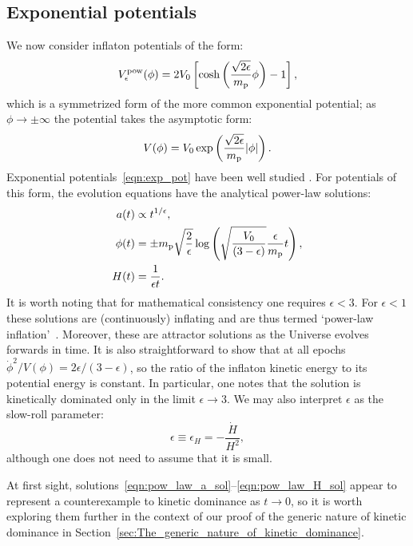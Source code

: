 \subsection{Exponential potentials}
\label{sec:Exponential_potentials}
We now consider inflaton potentials of the form:
%
\begin{equation}
  V^\mathrm{pow}_\epsilon(\phi) 
  = 
  2V_0\left[
  \cosh\left(\frac{\sqrt{2\epsilon}}{m_{\mathrm{p}}}\phi\right)-1
  \right],
  \label{eqn:coshpot}
\end{equation}
%
which is a symmetrized form of the more common exponential potential; as $\phi\rightarrow\pm\infty$ the potential takes the asymptotic form:
%
\begin{equation}
  V(\phi) 
  = 
  V_0 \exp\left(\frac{\sqrt{2\epsilon}}{m_{\mathrm{p}}} |\phi|\right).
  \label{eqn:exp_pot}
\end{equation}
%
Exponential potentials~\eqref{eqn:exp_pot} have been well studied \citep{yokoyama_dynamics_1988}. For potentials of this form, the evolution equations have the analytical power-law solutions:
%
\begin{align}
  a(t) 
  &\propto 
  {t}^{1/\epsilon},
  \label{eqn:pow_law_a_sol}
  \\
  \phi(t)
  &=
  \pm m_{\mathrm{p}}\sqrt{\frac{2}{\epsilon}}
  \log\left(\sqrt{\frac{V_0}{\left(3-\epsilon\right)}}
  \frac{\epsilon}{m_{\mathrm{p}}} t\right),
  \\
  H(t)
  &=
  \frac{1}{\epsilon t}.  
  \label{eqn:pow_law_H_sol}
\end{align}
%
It is worth noting that for mathematical consistency one requires $\epsilon < 3$. For $\epsilon<1$ these solutions are (continuously) inflating and are thus termed `power-law inflation'~\citep{lucchin_power-law_1985}. Moreover, these are attractor solutions as the Universe evolves forwards in time. It is also straightforward to show that at all epochs $\dot{\phi}^2/V(\phi) = 2\epsilon/(3-\epsilon)$, so the ratio of the inflaton kinetic energy to its potential energy is constant. In particular, one notes that the solution is kinetically dominated only in the limit $\epsilon \to 3$.  We may also interpret $\epsilon$ as the slow-roll parameter:
%
\begin{equation}
  \epsilon\equiv\epsilon_H = -\frac{\dot{H}}{H^2},
\end{equation}
%
although one does not need to assume that it is small.

At first sight, solutions~\eqref{eqn:pow_law_a_sol}--\eqref{eqn:pow_law_H_sol} appear to represent a counterexample to kinetic dominance as $t \to 0$, so it is worth exploring them further in the context of our proof of the generic nature of kinetic dominance in Section~\ref{sec:The_generic_nature_of_kinetic_dominance}. 

